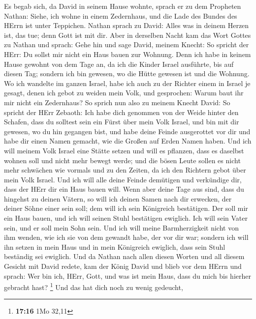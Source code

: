  Es begab sich, da David in seinem Hause wohnte, sprach er
zu dem Propheten Nathan: Siehe, ich wohne in einem Zedernhaus, und die
Lade des Bundes des HErrn ist unter Teppichen.  Nathan
sprach zu David: Alles was in deinem Herzen ist, das tue; denn Gott ist
mit dir.  Aber in derselben Nacht kam das Wort Gottes zu
Nathan und sprach:  Gehe hin und sage David, meinem
Knecht: So spricht der HErr: Du sollst mir nicht ein Haus bauen zur
Wohnung.  Denn ich habe in keinem Hause gewohnt von dem
Tage an, da ich die Kinder Israel ausführte, bis auf diesen Tag; sondern
ich bin gewesen, wo die Hütte gewesen ist und die Wohnung.
 Wo ich wandelte im ganzen Israel, habe ich auch zu der
Richter einem in Israel je gesagt, denen ich gebot zu weiden mein Volk,
und gesprochen: Warum baut ihr mir nicht ein Zedernhaus? 
So sprich nun also zu meinem Knecht David: So spricht der HErr Zebaoth:
Ich habe dich genommen von der Weide hinter den Schafen, dass du
solltest sein ein Fürst über mein Volk Israel,  und bin
mit dir gewesen, wo du hin gegangen bist, und habe deine Feinde
ausgerottet vor dir und habe dir einen Namen gemacht, wie die Großen auf
Erden Namen haben.  Und ich will meinem Volk Israel eine
Stätte setzen und will es pflanzen, dass es daselbst wohnen soll und
nicht mehr bewegt werde; und die bösen Leute sollen es nicht mehr
schwächen wie vormals und zu den Zeiten, da ich den Richtern gebot über
mein Volk Israel.  Und ich will alle deine Feinde
demütigen und verkündige dir, dass der HErr dir ein Haus bauen will.
 Wenn aber deine Tage aus sind, dass du hingehst zu
deinen Vätern, so will ich deinen Samen nach dir erwecken, der deiner
Söhne einer sein soll; dem will ich sein Königreich bestätigen.
 Der soll mir ein Haus bauen, und ich will seinen Stuhl
bestätigen ewiglich.  Ich will sein Vater sein, und er
soll mein Sohn sein. Und ich will meine Barmherzigkeit nicht von ihm
wenden, wie ich sie von dem gewandt habe, der vor dir war;
 sondern ich will ihn setzen in mein Haus und in mein
Königreich ewiglich, dass sein Stuhl beständig sei ewiglich.
 Und da Nathan nach allen diesen Worten und all diesem
Gesicht mit David redete,  kam der König David und blieb
vor dem HErrn und sprach: Wer bin ich, HErr, Gott, und was ist mein
Haus, dass du mich bis hierher gebracht hast? \footnote{\textbf{17:16}
  1Mo 32,11}  Und das hat dich noch zu wenig gedeucht,
